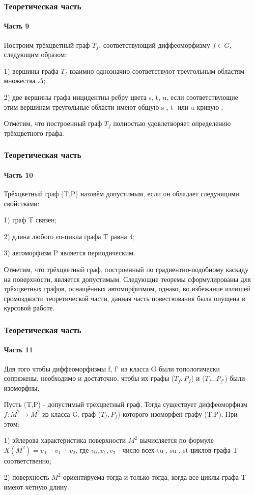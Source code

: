 \documentclass[aspectratio=169]{beamer}
\begin{document}
\begin{frame}
	\frametitle{Теоретическая часть}
	\framesubtitle{Часть 9}
	\begin{definition}
		Построим трёхцветный граф $T_f$, соответствующий диффеоморфизму $f \in G$, следующим образом:
		\par 1) вершины графа $T_f$ взаимно однозначно соответствуют треугольным областям множества $\Delta$;
		\par 2) две вершины графа инцидентны ребру цвета s, t, u, если соответствующие этим вершинам треугольные области имеют общую s-, t- или u-кривую .
	\end{definition}
	Отметим, что построенный граф $T_f$ полностью удовлетворяет определению трёхцветного графа.
\end{frame}

\begin{frame}
	\frametitle{Теоретическая часть}
	\framesubtitle{Часть 10}
	\begin{definition}
		Трёхцветный граф (T,P) назовём допустимым, если он обладает следующими свойствами:
		\par 1) граф T связен;
		\par 2) длина любого su-цикла графа T равна 4;
		\par 3) автоморфизм P является периодическим.
	\end{definition}
	Отметим, что трёхцветный граф, построенный по градиентно-подобному каскаду на поверхности, является допустимым. Следующие теоремы сформулированы для трёхцветных графов, оснащённых автоморфизмом, однако, во избежание излишей громоздкости теоретической части, данная часть повествования была опущена в курсовой работе.
\end{frame}

\begin{frame}
	\frametitle{Теоретическая часть}
	\framesubtitle{Часть 11}
	\begin{theorem}
		Для того чтобы диффеоморфизмы f, f' из класса G были топологически сопряжены, необходимо и достаточно, чтобы их графы ($T_f, P_f$) и ($T_{f'}, P_{f'}$) были изоморфны.
	\end{theorem}
	\begin{theorem}
		Пусть (T,P) - допустимый трёхцветный граф. Тогда существует диффеоморфизм $f:M^2 \rightarrow M^2$ из класса G, граф ($T_f, P_f$) которого изоморфен графу (T,P). При этом:
		\par 1) эйлерова характеристика поверхности $M^2$ вычисляется по формуле $X(M^2) = v_0 - v_1 + v_2$, где $v_0, v_1, v_2$ - число всех tu-, su-, st-циклов графа T соответственно;
		\par 2) поверхность $M^2$ ориентируема тогда и только тогда, когда все циклы графа T имеют чётную длину.
	\end{theorem}
\end{frame}
\end{document}
